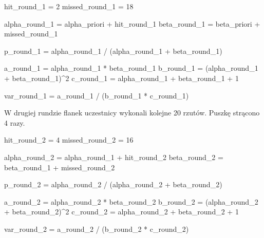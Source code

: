 \documentclass[
]{article}
\newenvironment{Shaded}{\begin{snugshade}}{\end{snugshade}}
\newcommand{\DecValTok}[1]{\textcolor[rgb]{0.00,0.00,0.81}{#1}}
\newcommand{\NormalTok}[1]{#1}
\newcommand{\OtherTok}[1]{\textcolor[rgb]{0.56,0.35,0.01}{#1}}
\newcommand{\SpecialCharTok}[1]{\textcolor[rgb]{0.00,0.00,0.00}{#1}}
\begin{document}
\begin{Shaded}
\begin{Highlighting}[]
\NormalTok{hit\_round\_1 }\OtherTok{=} \DecValTok{2}
\NormalTok{missed\_round\_1 }\OtherTok{=} \DecValTok{18}

\NormalTok{alpha\_round\_1 }\OtherTok{=}\NormalTok{ alpha\_priori }\SpecialCharTok{+}\NormalTok{ hit\_round\_1}
\NormalTok{beta\_round\_1 }\OtherTok{=}\NormalTok{ beta\_priori }\SpecialCharTok{+}\NormalTok{ missed\_round\_1}

\NormalTok{p\_round\_1 }\OtherTok{=}\NormalTok{ alpha\_round\_1 }\SpecialCharTok{/}\NormalTok{ (alpha\_round\_1 }\SpecialCharTok{+}\NormalTok{ beta\_round\_1)}

\NormalTok{a\_round\_1 }\OtherTok{=}\NormalTok{ alpha\_round\_1 }\SpecialCharTok{*}\NormalTok{ beta\_round\_1}
\NormalTok{b\_round\_1 }\OtherTok{=}\NormalTok{ (alpha\_round\_1 }\SpecialCharTok{+}\NormalTok{ beta\_round\_1)}\SpecialCharTok{\^{}}\DecValTok{2}
\NormalTok{c\_round\_1 }\OtherTok{=}\NormalTok{ alpha\_round\_1 }\SpecialCharTok{+}\NormalTok{ beta\_round\_1 }\SpecialCharTok{+} \DecValTok{1}

\NormalTok{var\_round\_1 }\OtherTok{=}\NormalTok{ a\_round\_1 }\SpecialCharTok{/}\NormalTok{ (b\_round\_1 }\SpecialCharTok{*}\NormalTok{ c\_round\_1)}
\end{Highlighting}
\end{Shaded}

W drugiej rundzie flanek uczestnicy wykonali kolejne 20 rzutów. Puszkę
strącono 4 razy.

\begin{Shaded}
\begin{Highlighting}[]
\NormalTok{hit\_round\_2 }\OtherTok{=} \DecValTok{4}
\NormalTok{missed\_round\_2 }\OtherTok{=} \DecValTok{16}

\NormalTok{alpha\_round\_2 }\OtherTok{=}\NormalTok{ alpha\_round\_1 }\SpecialCharTok{+}\NormalTok{ hit\_round\_2}
\NormalTok{beta\_round\_2 }\OtherTok{=}\NormalTok{ beta\_round\_1 }\SpecialCharTok{+}\NormalTok{ missed\_round\_2}

\NormalTok{p\_round\_2 }\OtherTok{=}\NormalTok{ alpha\_round\_2 }\SpecialCharTok{/}\NormalTok{ (alpha\_round\_2 }\SpecialCharTok{+}\NormalTok{ beta\_round\_2)}

\NormalTok{a\_round\_2 }\OtherTok{=}\NormalTok{ alpha\_round\_2 }\SpecialCharTok{*}\NormalTok{ beta\_round\_2}
\NormalTok{b\_round\_2 }\OtherTok{=}\NormalTok{ (alpha\_round\_2 }\SpecialCharTok{+}\NormalTok{ beta\_round\_2)}\SpecialCharTok{\^{}}\DecValTok{2}
\NormalTok{c\_round\_2 }\OtherTok{=}\NormalTok{ alpha\_round\_2 }\SpecialCharTok{+}\NormalTok{ beta\_round\_2 }\SpecialCharTok{+} \DecValTok{1}

\NormalTok{var\_round\_2 }\OtherTok{=}\NormalTok{ a\_round\_2 }\SpecialCharTok{/}\NormalTok{ (b\_round\_2 }\SpecialCharTok{*}\NormalTok{ c\_round\_2)}
\end{Highlighting}
\end{Shaded}
\end{document}
